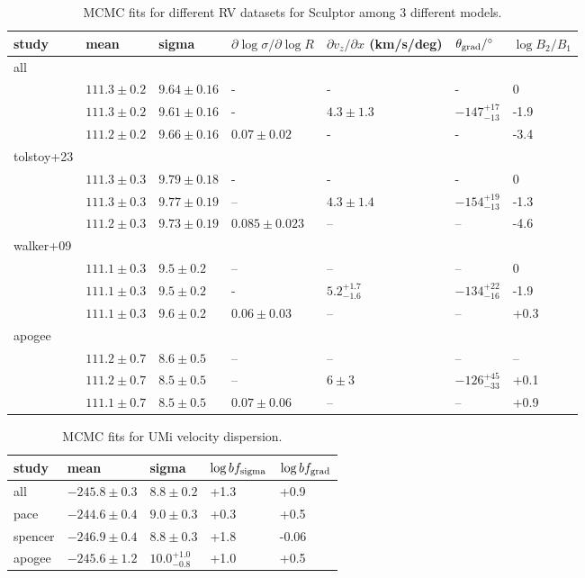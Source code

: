 \begin{table*}[t]
\centering
\caption[Sculptor RV fits]{MCMC fits for different RV datasets for Sculptor among 3 different models. }
\label{tbl:scl_rv_mcmc}
\begin{tabular}{lllllll}
\toprule
study & mean & sigma & $\partial \log\sigma / \partial \log R$ & $\partial v_z / \partial x$ (km/s/deg) & $\theta_{\rm grad} / ^{\circ}$ & $\log B_2/B_1$\\
\midrule
all &  &  &  &  &  & \\
 & $111.3\pm0.2$ & $9.64\pm0.16$ & - & - & - & 0\\
 & $111.3 \pm 0.2$ & $9.61 \pm0.16$ & - & $4.3\pm1.3$ & $-147_{-13}^{+17}$ & -1.9\\
 & $111.2\pm0.2$ & $9.66\pm0.16$ & $0.07\pm0.02$ & - & - & -3.4\\
tolstoy+23 &  &  &  &  &  & \\
 & $111.3 \pm 0.3$ & $9.79 \pm 0.18$ & - & - & - & 0\\
 & $111.3\pm0.3$ & $9.77\pm0.19$ & – & $4.3\pm1.4$ & $-154_{-13}^{+19}$ & -1.3\\
 & $111.2 \pm 0.3$ & $9.73\pm0.19$ & $0.085 \pm 0.023$ & – & – & -4.6\\
walker+09 &  &  &  &  &  & \\
 & $111.1\pm0.3$ & $9.5\pm0.2$ & – & – & – & 0\\
 & $111.1\pm0.3$ & $9.5\pm0.2$ & - & $5.2_{-1.6}^{+1.7}$ & $-134_{-16}^{+22}$ & -1.9\\
 & $111.1\pm0.3$ & $9.6\pm0.2$ & $0.06\pm0.03$ & – & – & +0.3\\
apogee &  &  &  &  &  & \\
 & $111.2\pm0.7$ & $8.6\pm0.5$ & – & – & – & –\\
 & $111.2\pm0.7$ & $8.5\pm0.5$ & – & $6\pm3$ & $-126_{-33}^{+45}$ & +0.1\\
 & $111.1\pm0.7$ & $8.5\pm0.5$ & $0.07\pm0.06$ & – & – & +0.9\\
\bottomrule
\end{tabular}
\end{table*}

\begin{table*}[t]
\centering
\caption[Ursa Minor RV fits]{MCMC fits for UMi velocity dispersion. }
\label{tbl:umi_rv_mcmc}
\begin{tabular}{lllll}
\toprule
study & mean & sigma & $\log bf_{\rm sigma}$ & $\log bf_{\rm grad}$\\
\midrule
all & $-245.8\pm0.3$ & $8.8\pm0.2$ & +1.3 & +0.9\\
pace & $-244.6\pm0.4$ & $9.0\pm0.3$ & +0.3 & +0.5\\
spencer & $-246.9\pm0.4$ & $8.8\pm0.3$ & +1.8 & -0.06\\
apogee & $-245.6\pm1.2$ & $10.0_{-0.8}^{+1.0}$ & +1.0 & +0.5\\
\bottomrule
\end{tabular}
\end{table*}

